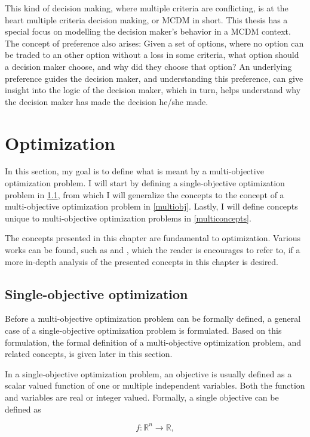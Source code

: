 This kind of decision making, where multiple criteria are conflicting, is at the heart multiple criteria decision making,
or MCDM in short. This thesis has a special focus on modelling the decision maker's behavior in a MCDM context. The concept
of preference also arises: Given a set of options, where no option can be traded to an other option without a loss in
some criteria, what option should a decision maker choose, and why did they choose that option? An underlying preference
guides the decision maker, and understanding this preference, can give insight into the logic of the decision maker,
which in turn, helps understand why the decision maker has made the decision he/she made.

\section{Optimization}
\label{multiopt}
In this section, my goal is to define what is meant by a multi-objective optimization problem. I will start by defining
a single-objective optimization problem in \ref{singleobj}, from which I will generalize the concepts to the concept of a multi-objective
optimization problem in \ref{multiobj}. Lastly, I will define concepts unique to multi-objective optimization problems in \ref{multiconcepts}.

The concepts presented in this chapter are fundamental to optimization. Various works can be found, such as \cite{Miettinen1998} and
\cite{yoshikazusawaragi1985}, which the reader is encourages to refer to, if a more in-depth analysis of the presented concepts in this
chapter is desired.

\subsection{Single-objective optimization}
\label{singleobj}
Before a multi-objective optimization problem can be formally defined, a general case of a single-objective optimization problem is
formulated. Based on this formulation, the formal definition of a multi-objective optimization problem, and related concepts, is
given later in this section.

In a single-objective optimization problem, an objective is usually defined as a scalar valued function of
one or multiple
independent variables. Both the function
and variables are real or integer valued. Formally, a single objective can be defined as

\begin{equation}
    \label{eq:objective}
    f: \mathbb{R}^n \to \mathbb{R},
\end{equation}

